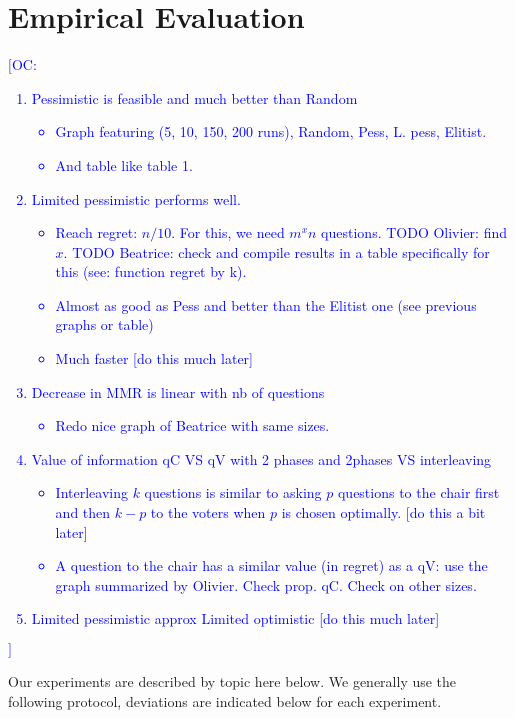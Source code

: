 \documentclass[sigconf, anonymous]{aamas}
\newcommand{\commentOC}[1]{\textcolor{blue}{\small$\big[$OC: #1$\big]$}}
\begin{document}
\section{Empirical Evaluation} 
\label{sec:experiments}
\commentOC{
	\begin{enumerate}
		\item Pessimistic is feasible and much better than Random
		\begin{itemize}
			\item Graph featuring (5, 10, 150, 200 runs), Random, Pess, L. pess, Elitist.
			\item And table like table 1.
		\end{itemize}
		\item Limited pessimistic performs well.
		\begin{itemize}
			\item Reach regret: $n/10$. For this, we need $m^x n$ questions. TODO Olivier: find $x$. TODO Beatrice: check and compile results in a table specifically for this (see: function regret by k).
			\item Almost as good as Pess and better than the Elitist one (see previous graphs or table)
			\item Much faster [do this much later]
		\end{itemize}
		\item Decrease in MMR is linear with nb of questions
		\begin{itemize}
			\item Redo nice graph of Beatrice with same sizes.
		\end{itemize}
		\item Value of information qC VS qV with 2 phases and 2phases VS interleaving
		\begin{itemize}
			\item Interleaving $k$ questions is similar to asking $p$ questions to the chair first and then $k - p$ to the voters when $p$ is chosen optimally. [do this a bit later]
			\item A question to the chair has a similar value (in regret) as a qV: use the graph summarized by Olivier. Check prop. qC. Check on other sizes.
		\end{itemize}
		\item Limited pessimistic approx Limited optimistic [do this much later]
	\end{enumerate}
}
Our experiments are described by topic here below. We generally use the following protocol, deviations are indicated below for each experiment.
\end{document}
